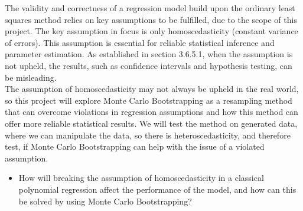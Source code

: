 \label{sec:PBS}
The validity and correctness of a regression model build upon the ordinary least squares method relies on key assumptions to be fulfilled, due to the scope of this project. The key assumption in focus is only homoscedasticity (constant variance of errors). This assumption is essential for reliable statistical inference and parameter estimation. As established in section 3.6.5.1, when the assumption is not upheld, the results, such as confidence intervals and hypothesis testing, can be misleading.\\
The assumption of homoscedasticity may not always be upheld in the real world, so this project will explore Monte Carlo Bootstrapping as a resampling method that can overcome violations in regression assumptions and how this method can offer more reliable statistical results. We will test the method on generated data, where we can manipulate the data, so there is heteroscedasticity, and therefore test, if Monte Carlo Bootstrapping can help with the issue of a violated assumption. 



\begin{itemize}
	\item How will breaking the assumption of homoscedasticity in a classical polynomial regression affect the performance of the model, and how can this be solved by using Monte Carlo Bootstrapping?
\end{itemize}
